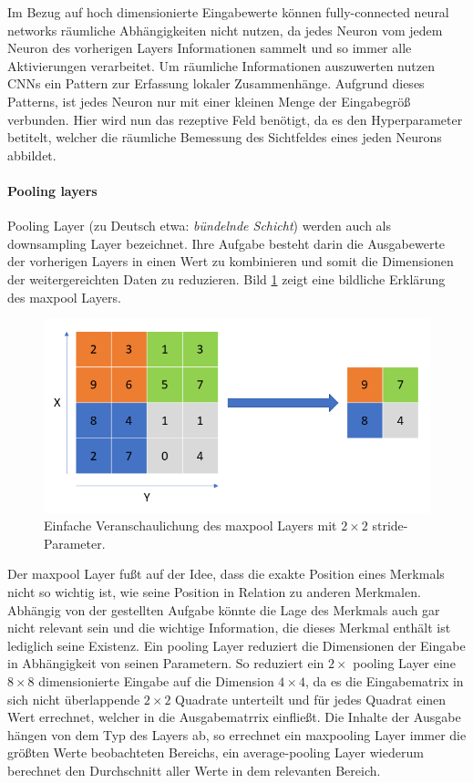 Im Bezug auf hoch dimensionierte Eingabewerte k\"onnen fully-connected neural networks r\"aumliche Abh\"angigkeiten nicht nutzen, da jedes Neuron vom jedem Neuron des vorherigen Layers Informationen sammelt und so immer alle Aktivierungen verarbeitet. Um r\"aumliche Informationen auszuwerten nutzen CNNs ein Pattern zur Erfassung lokaler Zusammenhänge. Aufgrund dieses Patterns, ist jedes Neuron nur mit einer kleinen Menge der Eingabegr\"o\ss{} verbunden. Hier wird nun das rezeptive Feld ben\"otigt, da es den Hyperparameter betitelt, welcher die r\"aumliche Bemessung des Sichtfeldes eines jeden Neurons abbildet.

\paragraph{Pooling layers}

Pooling Layer (zu Deutsch etwa: \textit{bündelnde Schicht}) werden auch als downsampling Layer bezeichnet. Ihre Aufgabe besteht darin die Ausgabewerte der vorherigen Layers in einen Wert zu kombinieren und somit die Dimensionen der weitergereichten Daten zu reduzieren. Bild \ref{fig:maxpool} zeigt eine bildliche Erkl\"arung des maxpool Layers.

\begin{figure}[H]
\centering
\includegraphics[scale=0.45]{pictures/grafiken/grafikenmax}
\caption[Caption for LOF]{Einfache Veranschaulichung des maxpool Layers mit $2 \times 2$ stride-Parameter.}
\label{fig:maxpool}

\end{figure}

Der maxpool Layer fu\ss{}t auf der Idee, dass die exakte Position eines Merkmals nicht so wichtig ist, wie seine Position in Relation zu anderen Merkmalen. Abh\"angig von der gestellten Aufgabe k\"onnte die Lage des Merkmals auch gar nicht relevant sein und die wichtige Information, die dieses Merkmal enth\"alt ist lediglich seine Existenz. Ein pooling Layer reduziert die Dimensionen der Eingabe in Abh\"angigkeit von seinen Parametern. So reduziert ein $2\times$ pooling Layer eine $8\times8$ dimensionierte Eingabe auf die Dimension $4\times4$, da es die Eingabematrix in sich nicht \"uberlappende $2\times2$ Quadrate unterteilt und f\"ur jedes Quadrat einen Wert errechnet, welcher in die Ausgabematrrix einflie\ss{}t. Die Inhalte der Ausgabe h\"angen von dem Typ des Layers ab, so errechnet ein maxpooling Layer immer die gr\"o\ss{}ten Werte beobachteten Bereichs, ein average-pooling Layer wiederum berechnet den Durchschnitt aller Werte in dem relevanten Bereich.

